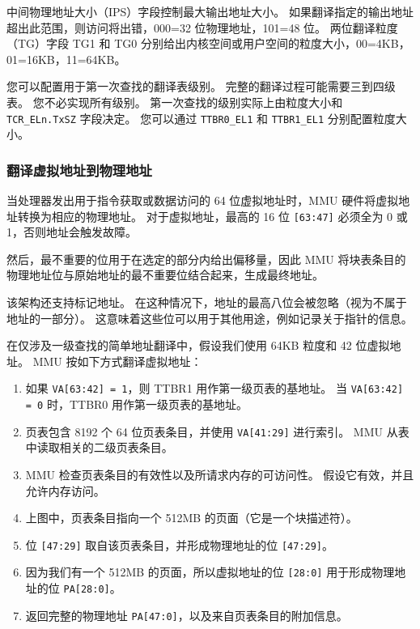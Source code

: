 中间物理地址大小（IPS）字段控制最大输出地址大小。
如果翻译指定的输出地址超出此范围，则访问将出错，000=32 位物理地址，101=48 位。
两位翻译粒度（TG）字段 TG1 和 TG0 分别给出内核空间或用户空间的粒度大小，00=4KB，01=16KB，11=64KB。

您可以配置用于第一次查找的翻译表级别。
完整的翻译过程可能需要三到四级表。
您不必实现所有级别。
第一次查找的级别实际上由粒度大小和 \lstinline!TCR_ELn.TxSZ! 字段决定。
您可以通过 \lstinline!TTBR0_EL1! 和 \lstinline!TTBR1_EL1! 分别配置粒度大小。

\subsubsection{翻译虚拟地址到物理地址}

当处理器发出用于指令获取或数据访问的 64 位虚拟地址时，MMU 硬件将虚拟地址转换为相应的物理地址。
对于虚拟地址，最高的 16 位 \lstinline![63:47]! 必须全为 0 或 1，否则地址会触发故障。

然后，最不重要的位用于在选定的部分内给出偏移量，因此 MMU 将块表条目的物理地址位与原始地址的最不重要位结合起来，生成最终地址。

该架构还支持标记地址。
在这种情况下，地址的最高八位会被忽略（视为不属于地址的一部分）。
这意味着这些位可以用于其他用途，例如记录关于指针的信息。


在仅涉及一级查找的简单地址翻译中，假设我们使用 64KB 粒度和 42 位虚拟地址。
MMU 按如下方式翻译虚拟地址：

\begin{enumerate}
  \item 如果 \lstinline!VA[63:42] = 1!，则 TTBR1 用作第一级页表的基地址。
    当 \lstinline!VA[63:42] = 0! 时，TTBR0 用作第一级页表的基地址。
  \item 页表包含 8192 个 64 位页表条目，并使用 \lstinline!VA[41:29]! 进行索引。
    MMU 从表中读取相关的二级页表条目。
  \item MMU 检查页表条目的有效性以及所请求内存的可访问性。
    假设它有效，并且允许内存访问。
  \item 上图中，页表条目指向一个 512MB 的页面（它是一个块描述符）。
  \item 位 \lstinline![47:29]! 取自该页表条目，并形成物理地址的位 \lstinline![47:29]!。
  \item 因为我们有一个 512MB 的页面，所以虚拟地址的位 \lstinline![28:0]! 用于形成物理地址的位 \lstinline!PA[28:0]!。
  \item 返回完整的物理地址 \lstinline!PA[47:0]!，以及来自页表条目的附加信息。
\end{enumerate}

